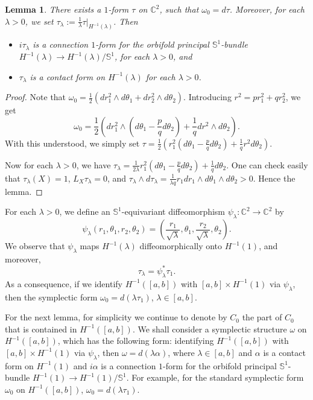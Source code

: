 \documentclass[11pt]{amsart}
\theoremstyle{plain}
\numberwithin{theorem}{section}
\newtheorem{lemma}[theorem]{Lemma}
\theoremstyle{definition}
\newcommand{\C}{{\mathbb C}}
\newcommand{\s}{{\mathbb S}}
\begin{document}
\begin{lemma}
There exists a $1$-form $\tau$ on $\C^2$, such that $\omega_0=d\tau$. Moreover, for each
$\lambda>0$, we set $\tau_\lambda:=\frac{1}{\lambda}\tau|_{H^{-1}(\lambda)}$. Then 
\begin{itemize}
\item [{(i)}] $i\tau_\lambda$ is a connection $1$-form for the orbifold principal $\s^1$-bundle 
$H^{-1}(\lambda)\rightarrow H^{-1}(\lambda)/\s^1$, for each $\lambda>0$, and 
\item [{(ii)}] $\tau_\lambda$ is a contact form on $H^{-1}(\lambda)$ for each $\lambda>0$.
\end{itemize}
\end{lemma}

\begin{proof}
Note that $\omega_0=\frac{1}{2} (dr_1^2\wedge d\theta_1+dr^2_2\wedge d\theta_2)$. Introducing
$r^2=pr_1^2+qr_2^2$, we get 
$$
\omega_0=\frac{1}{2} (dr_1^2\wedge (d\theta_1-\frac{p}{q}d\theta_2)+\frac{1}{q} dr^2\wedge d\theta_2).
$$
With this understood, we simply set $\tau=\frac{1}{2}(r_1^2(d\theta_1-\frac{p}{q}d\theta_2)+\frac{1}{q} r^2d\theta_2)$.

Now for each $\lambda>0$, we have 
$\tau_\lambda=\frac{1}{2\lambda} r_1^2(d\theta_1-\frac{p}{q}d\theta_2)+\frac{1}{q}d\theta_2$.
One can check easily that $\tau_\lambda(X)=1$, $L_X\tau_\lambda=0$, and 
$\tau_\lambda\wedge d\tau_\lambda=\frac{1}{\lambda q} r_1 dr_1\wedge d\theta_1\wedge d\theta_2>0$. Hence the lemma.

\end{proof}

For each $\lambda>0$, we define an $\s^1$-equivariant diffeomorphism 
$\psi_\lambda: \C^2\rightarrow \C^2$ by
$$
\psi_\lambda(r_1,\theta_1,r_2,\theta_2)=(\frac{r_1}{\sqrt{\lambda}},\theta_1, \frac{r_2}{\sqrt{\lambda}},
\theta_2).
$$
We observe that $\psi_\lambda$ maps $H^{-1}(\lambda)$ diffeomorphically onto $H^{-1}(1)$, and
moreover, 
$$
\tau_\lambda=\psi^\ast_\lambda \tau_1.
$$
As a consequence, if we identify $H^{-1}([a,b])$ with $[a,b]\times H^{-1}(1)$ via $\psi_\lambda$,
then the symplectic form $\omega_0=d(\lambda \tau_1)$, $\lambda\in [a,b]$. 

For the next lemma, for simplicity we continue to denote by $C_0$ the part of $C_0$ that is contained in $H^{-1}([a,b])$. We shall consider a symplectic structure $\omega$ on $H^{-1}([a,b])$, which has the following form:
identifying $H^{-1}([a,b])$ with $[a,b]\times H^{-1}(1)$ via $\psi_\lambda$, then $\omega=d(\lambda\alpha)$, where 
$\lambda\in [a,b]$ and $\alpha$ is a contact form on $H^{-1}(1)$ and $i\alpha$ is a connection $1$-form for the orbifold principal $\s^1$-bundle $H^{-1}(1)\rightarrow H^{-1}(1)/\s^1$. For example, for the standard symplectic form 
$\omega_0$ on $H^{-1}([a,b])$, $\omega_0=d(\lambda \tau_1)$.
\end{document}
